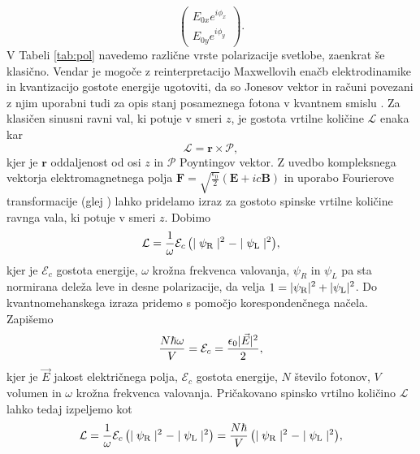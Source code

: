 \documentclass[12pt]{article}
\begin{document}
\begin{equation}
{\displaystyle {\begin{pmatrix}E_{0x}e^{i\phi _{x}}\\E_{0y}e^{i\phi _{y}}\end{pmatrix}}.}
\end{equation} 
V Tabeli \ref{tab:pol} navedemo različne vrste polarizacije svetlobe, zaenkrat še klasično. Vendar je mogoče z reinterpretacijo Maxwellovih enačb elektrodinamike in kvantizacijo gostote energije ugotoviti, da so Jonesov vektor in računi povezani z njim  uporabni tudi za opis stanj posameznega fotona v kvantnem smislu \cite{PhotonPolarization2022}. Za klasičen sinusni ravni val, ki potuje v smeri $z$, je gostota vrtilne količine $\mathcal{L}$ enaka kar 
\begin{equation}
 \boldsymbol { \mathcal{L} } = \mathbf{r} \times \boldsymbol { \mathcal{P} },
\end{equation}
kjer je $\mathbf{r}$ oddaljenost od osi $z$ in $\boldsymbol{\mathcal{P}}$ Poyntingov vektor. Z uvedbo kompleksnega vektorja elektromagnetnega polja $ \mathbf{F} = \sqrt{\frac{\epsilon_0}{2}} (\mathbf{E} + ic \mathbf{B}) $ in uporabo Fourierove transformacije (glej \cite{bialynicki-birulaCanonicalSeparationAngular2011}) lahko pridelamo izraz za gostoto spinske vrtilne količine ravnga vala, ki potuje v smeri $z$. Dobimo
\begin{equation}
{\displaystyle {\mathcal {L}}={1 \over \omega }{\mathcal {E}}_{c}\left(\mid \psi _{\rm {R}}\mid ^{2}-\mid \psi _{\rm {L}}\mid ^{2}\right)},
\end{equation}
kjer je $\mathcal{E}_c$ gostota energije, $\omega$ krožna frekvenca valovanja, $\psi_R$ in $\psi_L$ pa sta normirana deleža leve in desne polarizacije, da velja ${\displaystyle 1=|\psi _{\rm {R}}|^{2}+|\psi _{\rm {L}}|^{2}}$. Do kvantnomehanskega izraza pridemo s pomočjo korespondenčnega načela. Zapišemo
\begin{equation}
    {N \hbar \omega \over V} = \mathcal{E}_c = \frac{ \epsilon_0 | \vec{E} |^2}{2}, \end{equation}
kjer je $\vec{E}$ jakost električnega polja, $\mathcal{E}_c$ gostota energije, $N$ število fotonov, $V$ volumen in $\omega$ krožna frekvenca valovanja. Pričakovano spinsko vrtilno količino $\mathcal {L}$ lahko tedaj izpeljemo kot
\begin{equation}
{\displaystyle {\mathcal {L}}={1 \over \omega }{\mathcal {E}}_{c}\left(\mid \psi _{\rm {R}}\mid ^{2}-\mid \psi _{\rm {L}}\mid ^{2}\right)={N\hbar  \over V}\left(\mid \psi _{\rm {R}}\mid ^{2}-\mid \psi _{\rm {L}}\mid ^{2}\right)},
\end{equation}
\end{document}
